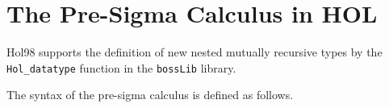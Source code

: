 \documentclass[envcountsame,runningheads]{llncs}
\begin{document}


%
\section{The Pre-Sigma Calculus in HOL}
%
\label{presigmacalculus}

Hol98 supports the definition of new nested mutually recursive types
by the {\tt Hol\_datatype} function in the
{\tt bossLib} library.



The syntax
of the pre-sigma calculus
is defined as follows.
\end{document}
